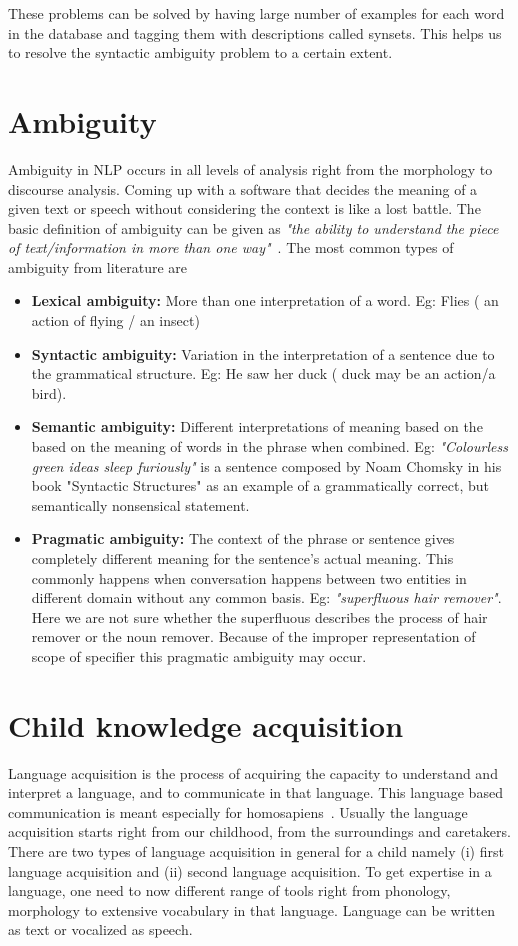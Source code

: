 \documentclass{bmcart}
\begin{document}
These problems can be solved by having large number of examples for each word in the database and tagging them with descriptions called synsets. This helps us to resolve the syntactic ambiguity problem to a certain extent. 

\section{Ambiguity}
\label{sec:ambiguity}
Ambiguity in NLP occurs in all levels of analysis right from the morphology to discourse analysis. Coming up with a software that decides the meaning of a given text or speech without considering the context is like a lost battle. The basic definition of ambiguity 
can be given as \textit{"the ability to understand the piece of text/information in more than one way"}~\cite{ambiguityTypes}. The most common types of ambiguity from literature are
\begin{itemize}
\item {\bf Lexical ambiguity:} More than one interpretation of a word. Eg: Flies ( an action of flying / an insect)
\item {\bf Syntactic ambiguity:} Variation in the interpretation of a sentence due to the grammatical structure. Eg: He saw her duck ( duck may be an action/a bird).
\item {\bf Semantic ambiguity:} Different interpretations of meaning based on the based on the meaning of words in the phrase when combined. Eg: \textit{"Colourless green ideas sleep furiously"} is a sentence composed by Noam Chomsky in his book "Syntactic Structures" as an example of a grammatically correct, but semantically nonsensical statement. 
\item {\bf Pragmatic ambiguity:} The context of the phrase or sentence gives completely different meaning for the sentence's actual meaning. This commonly happens when conversation happens between two entities in different domain without any common basis. 
Eg: \textit{"superfluous hair remover"}. Here we are not sure whether the superfluous describes the process of hair remover or the noun remover. Because of the improper representation of scope of specifier this pragmatic ambiguity may occur.
\end{itemize}

\section{Child knowledge acquisition}
\label{sec:child}
Language acquisition is the process of acquiring the capacity to understand and interpret a language, and to communicate in that language. This language based communication is meant especially for homosapiens~\cite{childknowledge}. Usually the language acquisition starts right from our childhood, from the surroundings and caretakers. There are two types of language acquisition in general for a child namely (i) first language acquisition and (ii) second language acquisition. To get expertise in a language, one need to now different range of tools right from phonology, morphology to extensive vocabulary in that language. Language can be written as text or vocalized as speech. 
\end{document}
